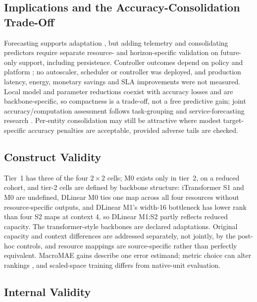 \subsection{Implications and the Accuracy-Consolidation Trade-Off}
\label{sec:discussion-systems}
\label{sec:discussion-efficiency}

Forecasting supports adaptation
\citep{Taherizadeh2018Monitoring,Bauer2020SelfAware}, but adding telemetry and
consolidating predictors require separate resource- and horizon-specific
validation on future-only support, including persistence. Controller outcomes
depend on policy and platform \citep{Qu2018Autoscaling}; no autoscaler,
scheduler or controller was deployed, and production latency, energy,
monetary savings and SLA improvements were not measured. Local model and
parameter reductions coexist with accuracy losses and are backbone-specific,
so compactness is a trade-off, not a free predictive gain; joint
accuracy/computation assessment follows task-grouping and service-forecasting
research \citep{Standley2020TaskGrouping,Syu2017DynamicQoS}. Per-entity
consolidation may still be attractive where modest target-specific accuracy
penalties are acceptable, provided adverse tails are checked.

\subsection{Construct Validity}
\label{sec:threats-construct}

Tier~1 has three of the four $2\times2$ cells; M0 exists only in tier~2, on a
reduced cohort, and tier-2 cells are defined by backbone structure:
iTransformer S1 and M0 are undefined, DLinear M0 ties one map across all four
resources without resource-specific outputs, and DLinear M1's width-16
bottleneck has lower rank than four S2 maps at context 4, so DLinear M1:S2
partly reflects reduced capacity. The transformer-style backbones are declared
adaptations. Original capacity and context differences are addressed
separately, not jointly, by the post-hoc controls, and resource mappings are
source-specific rather than perfectly equivalent. MacroMAE gains describe one
error estimand; metric choice can alter rankings \citep{Hyndman2006Accuracy},
and scaled-space training differs from native-unit evaluation.

\subsection{Internal Validity}
\label{sec:threats-internal}

